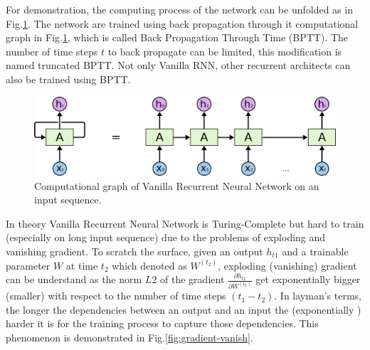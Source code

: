 For demonstration, the computing process of the network can be unfolded as in Fig.\ref{fig:rnn-unfold}. 
The network are trained using back propagation through it computational graph in Fig.\ref{fig:rnn-unfold}, which is called Back Propagation Through Time (BPTT)\cite{BPTT}. 
The number of time steps \(t\) to back propagate can be limited, this modification is named truncated BPTT\cite{truncatedBPTT}. 
Not only Vanilla RNN, other recurrent architects can also be trained using BPTT.

\begin{figure}[H]
	\centering
	\includegraphics[scale=0.4]{figure/rnn-unroll}
	\caption{Computational graph of Vanilla Recurrent Neural Network on an input sequence\cite{colah-lsmt}.}
	\label{fig:rnn-unfold}
\end{figure}
\label{sec:gradient-vanish}
In theory Vanilla Recurrent Neural Network is Turing-Complete\cite{rnn-turing-complete} but  hard to train (especially on long input sequence) due to the problems of exploding and vanishing gradient\cite{Bengio1994}. 
To scratch the surface, given an output \(h_{t1}\) and a trainable parameter \(W\) at time \(t_2\) which denoted as \(W^{(t_2)}\),  exploding (vanishing) gradient can be understand as the norm \(L2\) of the gradient \(\frac{\partial h_{t1}}{\partial W^{(t_2)}}\) get exponentially bigger (smaller) with respect to the number of time steps \((t_1-t_2)\)\cite{Bengio1994}.
In layman's terms, the longer the dependencies between an output and an input the (exponentially ) harder it is for the training process to capture those dependencies.
This phenomenon is demonstrated in Fig.\ref{fig:gradient-vanish}. 

